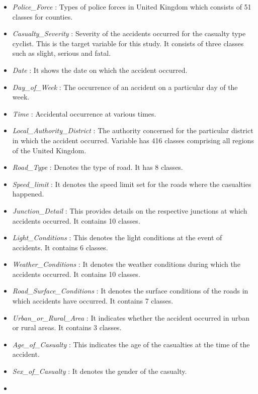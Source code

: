 \documentclass[
  a4paper,
]{article}
\begin{document}
\begin{itemize}
  \begin{itemize}
  \item
    \emph{Police\_Force} : Types of police forces in United Kingdom
    which consists of 51 classes for counties.
  \item
    \emph{Casualty\_Severity} : Severity of the accidents occurred for
    the casualty type cyclist. This is the target variable for this
    study. It consists of three classes such as slight, serious and
    fatal.
  \item
    \emph{Date} : It shows the date on which the accident occurred.
  \item
    \emph{Day\_of\_Week} : The occurrence of an accident on a particular
    day of the week.
  \item
    \emph{Time} : Accidental occurrence at various times.
  \item
    \emph{Local\_Authority\_District} : The authority concerned for the
    particular district in which the accident occurred. Variable has 416
    classes comprising all regions of the United Kingdom.
  \item
    \emph{Road\_Type} : Denotes the type of road. It has 8 classes.
  \item
    \emph{Speed\_limit} : It denotes the speed limit set for the roads
    where the casualties happened.
  \item
    \emph{Junction\_Detail} : This provides details on the respective
    junctions at which accidents occurred. It contains 10 classes.
  \item
    \emph{Light\_Conditions} : This denotes the light conditions at the
    event of accidents. It contains 6 classes.
  \item
    \emph{Weather\_Conditions} : It denotes the weather conditions
    during which the accidents occurred. It contains 10 classes.
  \item
    \emph{Road\_Surface\_Conditions} : It denotes the surface conditions
    of the roads in which accidents have occurred. It contains 7
    classes.
  \item
    \emph{Urban\_or\_Rural\_Area} : It indicates whether the accident
    occurred in urban or rural areas. It contains 3 classes.
  \item
    \emph{Age\_of\_Casualty} : This indicates the age of the casualties
    at the time of the accident.
  \item
    \emph{Sex\_of\_Casualty} : It denotes the gender of the casualty.
  \item

\end{itemize}
\end{itemize}
\end{document}
